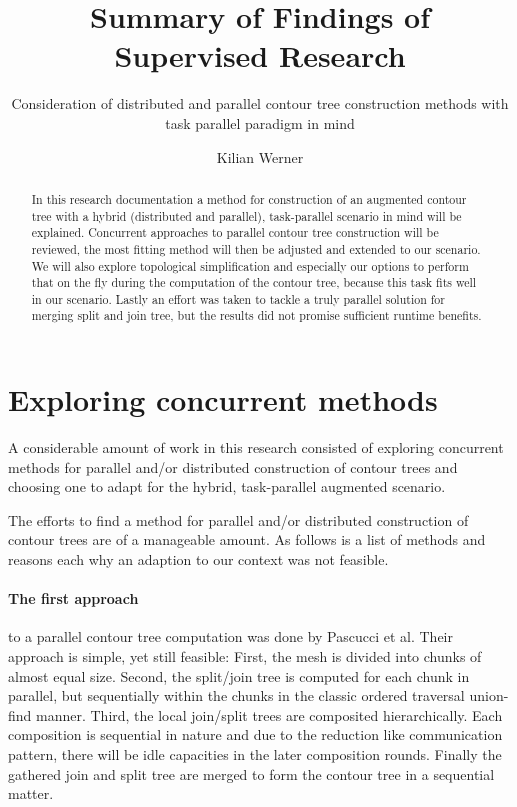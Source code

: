 \documentclass{scrartcl}
\begin{document}
  
\title {Summary of Findings of Supervised Research}
\subtitle {Consideration of distributed and parallel contour tree construction methods with task parallel paradigm in mind}
\author {Kilian Werner}
\maketitle
\begin{abstract}
In this research documentation a method for construction of an augmented contour tree with a hybrid (distributed and parallel), task-parallel scenario in mind will be explained. Concurrent approaches to parallel contour tree construction will be reviewed, the most fitting method will then be adjusted and extended to our scenario. We will also explore topological simplification and especially our options to perform that on the fly during the computation of the contour tree, because this task fits well in our scenario. Lastly an effort was taken to tackle a truly parallel solution for merging split and join tree, but the results did not promise sufficient runtime benefits.
\end{abstract}
\newpage
\tableofcontents
\newpage
{}
\section{Exploring concurrent methods}  %

A considerable amount of work in this research consisted of exploring concurrent methods for parallel and/or distributed construction of contour trees and choosing one to adapt for the hybrid, task-parallel augmented scenario.

The efforts to find a method for parallel and/or distributed construction of contour trees are of a manageable amount. As follows is a list of methods and reasons each why an adaption to our context was not feasible.

\paragraph{The first approach} to a parallel contour tree computation was done by Pascucci et al. \cite{pascucci1} Their approach is simple, yet still feasible: First, the mesh is divided into chunks of almost equal size. Second, the split/join tree is computed for each chunk in parallel, but sequentially within the chunks in the classic ordered traversal union-find manner. Third, the local join/split trees are composited hierarchically. Each composition is sequential in nature and due to the reduction like communication pattern, there will be idle capacities in the later composition rounds. Finally the gathered join and split tree are merged to form the contour tree in a sequential matter.
\end{document}
